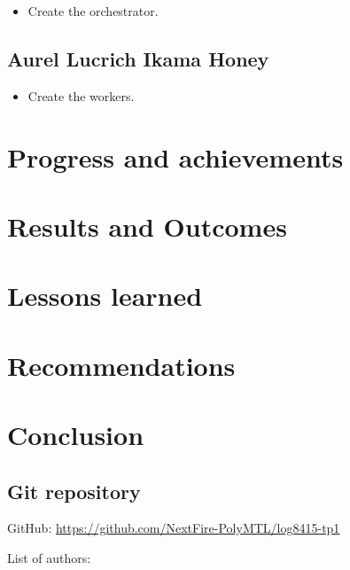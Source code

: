 \documentclass[letterpaper,headings=standardclasses,parskip=half]{scrartcl}
\newcommand{\todo}{{\color{red}{TODO}}}
\begin{document}
\begin{itemize}
    \item Create the orchestrator.
\end{itemize}

\subsection*{Aurel Lucrich Ikama Honey}

\begin{itemize}
    \item Create the workers.
\end{itemize}

\section{Progress and achievements}

\todo

\section{Results and Outcomes}

\todo

\section{Lessons learned}

\todo

\section{Recommendations}

\todo

\section{Conclusion}

\todo


\subsection*{Git repository}

GitHub: \url{https://github.com/NextFire-PolyMTL/log8415-tp1}

List of authors:
\end{document}
